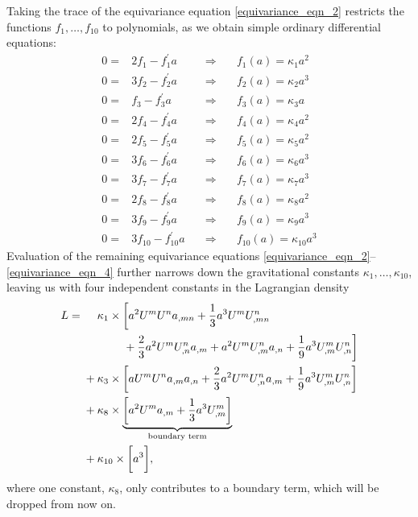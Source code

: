 Taking the trace of the equivariance equation \eqref{equivariance_eqn_2} restricts the functions $f_1,\dots, f_{10}$ to polynomials, as we obtain simple ordinary differential equations:
\begin{equation}\label{cosmo_ansaetze}
  \begin{aligned}
    0 = {} & 2 f_1 - f_1^\prime a \quad & \Rightarrow & \quad f_1(a) = \kappa_1 a^2 \\
    0 = {} & 3 f_2 - f_2^\prime a \quad & \Rightarrow & \quad f_2(a) = \kappa_2 a^3 \\
    0 = {} & f_3 - f_3^\prime a \quad & \Rightarrow & \quad f_3(a) = \kappa_3 a \\
    0 = {} & 2 f_4 - f_4^\prime a \quad & \Rightarrow & \quad f_4(a) = \kappa_4 a^2 \\
    0 = {} & 2 f_5 - f_5^\prime a \quad & \Rightarrow & \quad f_5(a) = \kappa_5 a^2 \\
    0 = {} & 3 f_6 - f_6^\prime a \quad & \Rightarrow & \quad f_6(a) = \kappa_6 a^3 \\
    0 = {} & 3 f_7 - f_7^\prime a \quad & \Rightarrow & \quad f_7(a) = \kappa_7 a^3 \\
    0 = {} & 2 f_8 - f_8^\prime a \quad & \Rightarrow & \quad f_8(a) = \kappa_8 a^2 \\
    0 = {} & 3 f_9 - f_9^\prime a \quad & \Rightarrow & \quad f_9(a) = \kappa_9 a^3 \\
    0 = {} & 3 f_{10} - f_{10}^\prime a \quad & \Rightarrow & \quad f_{10}(a) = \kappa_{10} a^3
  \end{aligned}
\end{equation}
Evaluation of the remaining equivariance equations \eqref{equivariance_eqn_2}--\eqref{equivariance_eqn_4} further narrows down the gravitational constants $\kappa_1,\dots,\kappa_{10}$, leaving us with four independent constants in the Lagrangian density
\begin{equation}\label{cosmo_lagrangian}
  \begin{aligned}
    L = {} & \mathbin{\hphantom{+}} \kappa_1 \times \bigg\lbrack a^2 U^m U^n a_{,mn} + \frac{1}{3} a^3 U^m U^n_{,mn} \\ {} & \hphantom{+ \kappa_1 \times \bigg\lbrack } + \frac{2}{3} a^2 U^m U^n_{,n} a_{,m} + a^2 U^m U^n_{,m} a_{,n} + \frac{1}{9} a^3 U^m_{,m} U^n_{,n} \bigg\rbrack \\
    {} & + \kappa_3 \times \bigg\lbrack a U^m U^n a_{,m} a_{,n} + \frac{2}{3} a^2 U^m U^n_{,n} a_{,m} + \frac{1}{9} a^3 U^m_{,m} U^n_{,n}\bigg\rbrack \\
    {} & + \kappa_8 \times \underbrace{\bigg\lbrack a^2 U^m a_{,m} + \frac{1}{3} a^3 U^m_{,m} \bigg\rbrack}_{\text{boundary term}} \\
    {} & + \kappa_{10} \times \bigg\lbrack a^3 \bigg\rbrack,
  \end{aligned}
\end{equation}
where one constant, $\kappa_8$, only contributes to a boundary term, which will be dropped from now on.

